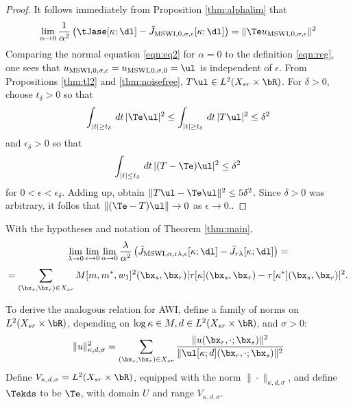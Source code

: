 \begin{proof}
  It follows immediately from Proposition \ref{thm:alphalim} that
  \[
    \lim_{\alpha \rightarrow 0}
    \frac{1}{\alpha^2}\left(\tJase[\kappa;\dl]-\tilde{J}_{\rm MSWI,0,\sigma,\epsilon}[\kappa;\dl]\right)=
    \|\Te u_{\rm MSWI,0,\sigma,\epsilon}\|^2
  \]
  Comparing the normal equation \ref{eqn:eq2} for $\alpha=0$
  to the definition \ref{eqn:reg}, one sees that  $u_{\rm
    MSWI,0,\sigma,\epsilon} = u_{\rm MSWI,0,\sigma,0} = \ul$ is
  independent of $\epsilon$. From
  Propositions \ref{thm:tl2} and \ref{thm:noisefree}, $T\ul \in
  L^2(X_{sr} \times \bR)$. For $\delta>0$, choose $t_{\delta} > 0$ so
  that
  \[
    \int_{|t| \ge t_{\delta}} \,dt\, |\Te \ul|^2 \le  \int_{|t| \ge
      t_{\delta}} \,dt\, |T \ul|^2 \le \delta^2
  \]
  and $\epsilon_{\delta}>0$ so that
  \[
    \int_{|t| \le t_{\delta}} \,dt\, |(T-\Te) \ul|^2 \le \delta^2
  \]
  for $0<\epsilon<\epsilon_{\delta}$. Adding up, obtain $\|T\ul
  -\Te\ul\|^2 \le 5\delta^2$. Since $\delta>0$ was arbitrary, it
  follos that $\|(\Te -T)\ul\| \rightarrow 0$ as $\epsilon \rightarrow
  0$..
\end{proof}

\begin{cor}
  \label{thm:cor2}
  With the hypotheses and notation of Theorem \ref{thm:main},
  \[
    \lim_{\lambda \rightarrow 0}\lim_{\epsilon \rightarrow 0}\lim_{\alpha \rightarrow 0}
  \frac{\lambda}{\alpha^2}\left(\tilde{J}_{\rm MSWI,\alpha,r\lambda,\epsilon}[\kappa;\dl]-\tilde{J}_{r\lambda}[\kappa;\dl]\right)=
  \]
  \begin{equation}
    \label{eqn:main1}
    = \sum_{(\bx_s,\bx_r) \in X_{sr}}
    M[m,m^*,w_1]^2(\bx_s,\bx_r) |\tau[\kappa](\bx_s,\bx_r) -
    \tau[\kappa^*](\bx_s,\bx_r)|^2.
  \end{equation}
\end{cor}

To derive the analogous relation for AWI, define a family of norms on
$ L^2(X_{sr} \times \bR)$, depending on $\log \kappa \in M, d \in
L^2(X_{sr} \times \bR)$, and $\sigma >0$:
\begin{equation}
  \label{eqn:awinormdef}
  \|u\|^2_{\kappa,d,\sigma} = \sum_{(\bx_s,\bx_r) \in X_{sr}}\frac{\|u(\bx_r,\cdot;\bx_s)\|^2}{\|\ul[\kappa;d](\bx_r,\cdot;\bx_s)\|^2}
\end{equation}
Define $V_{\kappa,d,\sigma} = L^2(X_{sr} \times \bR)$, equipped with
the norm $\|\cdot\|_{\kappa,d,\sigma}$, and define $\Tekds$ to be
$\Te$, with domain $U$ and range $V_{\kappa,d,\sigma}$.

